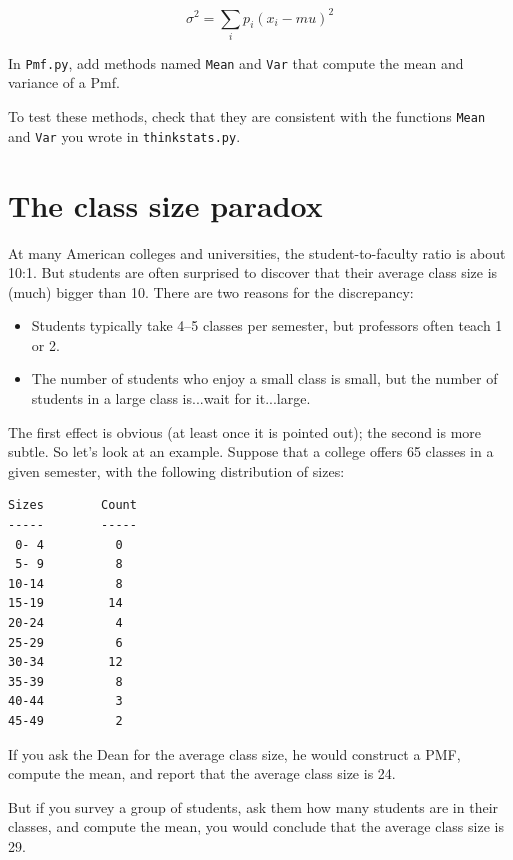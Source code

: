 \documentclass[12pt]{book}
\begin{document}
\[ \sigma^2 = \sum_i p_i (x_i - mu)^2\]

\begin{ex}
In {\tt Pmf.py}, add methods named {\tt Mean} and {\tt Var} that compute
the mean and variance of a Pmf.

To test these methods, check that they are consistent with the
functions {\tt Mean} and {\tt Var} you wrote in {\tt thinkstats.py}.
\end{ex}


\section{The class size paradox}

At many American colleges and universities, the student-to-faculty
ratio is about 10:1.  But students are often surprised to discover
that their average class size is (much) bigger than 10.  There
are two reasons for the discrepancy:

\begin{itemize}

\item Students typically take 4--5 classes per semester, but
professors often teach 1 or 2.

\item The number of students who enjoy a small class is small,
but the number of students in a large class is...wait for it...large.

\end{itemize}

The first effect is obvious (at least once it is pointed out);
the second is more subtle.  So let's look at an example.  Suppose
that a college offers 65 classes in a given semester, with the
following distribution of sizes:

\begin{verbatim}
Sizes        Count
-----        -----
 0- 4          0
 5- 9          8
10-14          8
15-19         14
20-24          4
25-29          6
30-34         12
35-39          8
40-44          3
45-49          2
\end{verbatim}

If you ask the Dean for the average class size, he would
construct a PMF, compute the mean, and report that the
average class size is 24.

But if you survey a group of students, ask them how many
students are in their classes, and compute the mean, you would
conclude that the average class size is 29.
\end{document}

